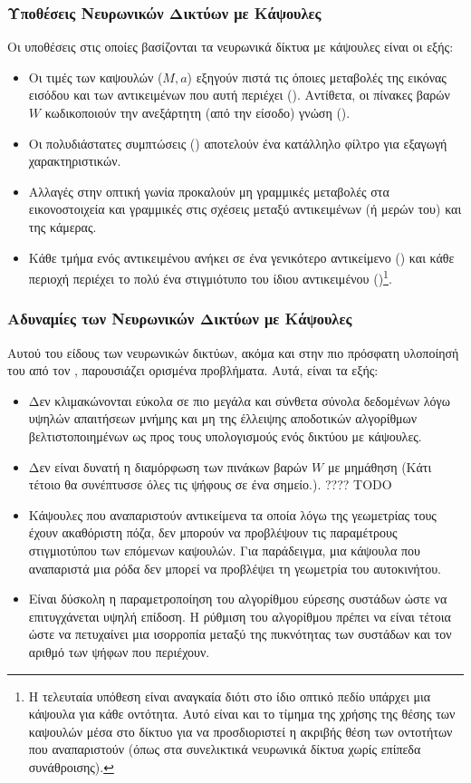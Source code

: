 \subsubsection{Υποθέσεις Νευρωνικών Δικτύων με Κάψουλες}
Οι υποθέσεις στις οποίες βασίζονται τα νευρωνικά δίκτυα με κάψουλες είναι οι εξής:
\begin{itemize}
  \item Οι τιμές των καψουλών ($M,a$) εξηγούν πιστά τις όποιες μεταβολές της εικόνας εισόδου και των αντικειμένων που αυτή περιέχει (). Αντίθετα, οι πίνακες βαρών $W$ κωδικοποιούν την ανεξάρτητη (από την είσοδο) γνώση ().
  \item Οι πολυδιάστατες συμπτώσεις () αποτελούν ένα κατάλληλο φίλτρο για εξαγωγή χαρακτηριστικών.
  \item Αλλαγές στην οπτική γωνία προκαλούν μη γραμμικές μεταβολές στα εικονοστοιχεία και γραμμικές στις σχέσεις μεταξύ αντικειμένων (ή μερών του) και της κάμερας.
  \item Κάθε τμήμα ενός αντικειμένου ανήκει σε ένα γενικότερο αντικείμενο () και κάθε περιοχή περιέχει το πολύ ένα στιγμιότυπο του ίδιου αντικειμένου ()\footnote{Η τελευταία υπόθεση είναι αναγκαία διότι στο ίδιο οπτικό πεδίο υπάρχει μια κάψουλα για κάθε οντότητα. Αυτό είναι και το τίμημα της χρήσης της θέσης των καψουλών μέσα στο δίκτυο για να προσδιοριστεί η ακριβής θέση των οντοτήτων που αναπαριστούν (όπως στα συνελικτικά νευρωνικά δίκτυα χωρίς επίπεδα συνάθροισης).}.
\end{itemize}

\subsubsection{Αδυναμίες των Νευρωνικών Δικτύων με Κάψουλες}
Αυτού του είδους των νευρωνικών δικτύων, ακόμα και στην πιο πρόσφατη υλοποίησή του από τον , παρουσιάζει ορισμένα προβλήματα. Αυτά, είναι τα εξής:
\begin{itemize}
  \item Δεν κλιμακώνονται εύκολα σε πιο μεγάλα και σύνθετα σύνολα δεδομένων λόγω υψηλών απαιτήσεων μνήμης και μη της έλλειψης αποδοτικών αλγορίθμων βελτιστοποιημένων ως προς τους υπολογισμούς ενός δικτύου με κάψουλες.
  \item Δεν είναι δυνατή η διαμόρφωση των πινάκων βαρών $W$ με μη μάθηση (Κάτι τέτοιο θα συνέπτυσσε όλες τις ψήφους σε ένα σημείο.). ???? TODO
  \item Κάψουλες που αναπαριστούν αντικείμενα τα οποία λόγω της γεωμετρίας τους έχουν ακαθόριστη πόζα, δεν μπορούν να προβλέψουν τις παραμέτρους στιγμιοτύπου των επόμενων καψουλών. Για παράδειγμα, μια κάψουλα που αναπαριστά μια ρόδα δεν μπορεί να προβλέψει τη γεωμετρία του αυτοκινήτου.
  \item Είναι δύσκολη η παραμετροποίηση του αλγορίθμου εύρεσης συστάδων ώστε να επιτυγχάνεται υψηλή επίδοση. Η ρύθμιση του αλγορίθμου πρέπει να είναι τέτοια ώστε να πετυχαίνει μια ισορροπία μεταξύ της πυκνότητας των συστάδων και τον αριθμό των ψήφων που περιέχουν. 
\end{itemize}


